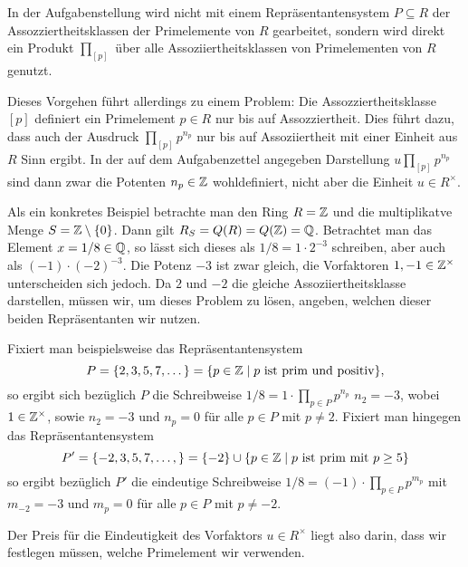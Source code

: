 \documentclass[a4paper,10pt,numbers=noenddot]{scrartcl}
\begin{document}
\begin{remark}
  In der Aufgabenstellung wird nicht mit einem Repräsentantensystem $P \subseteq R$ der Assozziertheitsklassen der Primelemente von $R$ gearbeitet, sondern wird direkt ein Produkt $\prod_{[p]}$ über alle Assoziiertheitsklassen von Primelementen von $R$ genutzt.
  
  Dieses Vorgehen führt allerdings zu einem Problem:
  Die Assozziertheitsklasse $[p]$ definiert ein Primelement $p \in R$ nur bis auf Assozziertheit.
  Dies führt dazu, dass auch der Ausdruck $\prod_{[p]} p^{n_p}$ nur bis auf Assoziiertheit mit einer Einheit aus $R$ Sinn ergibt.
  In der auf dem Aufgabenzettel angegeben Darstellung $u \prod_{[p]} p^{n_p}$ sind dann zwar die Potenten $n_p \in \mathbb{Z}$ wohldefiniert, nicht aber die Einheit $u \in R^\times$.
  
  Als ein konkretes Beispiel betrachte man den Ring $R = \mathbb{Z}$ und die multiplikatve Menge $S = \mathbb{Z} \setminus \{0\}$.
  Dann gilt $R_S = Q(R) = Q(\mathbb{Z}) = \mathbb{Q}$.
  Betrachtet man das Element $x = 1/8 \in \mathbb{Q}$, so lässt sich dieses als $1/8 = 1 \cdot 2^{-3}$ schreiben, aber auch als $(-1) \cdot (-2)^{-3}$.
  Die Potenz $-3$ ist zwar gleich, die Vorfaktoren $1, -1 \in \mathbb{Z}^\times$ unterscheiden sich jedoch.
  Da $2$ und $-2$ die gleiche Assoziiertheitsklasse darstellen, müssen wir, um dieses Problem zu lösen, angeben, welchen dieser beiden Repräsentanten wir nutzen.
  
  Fixiert man beispielsweise das Repräsentantensystem
  \[
      P
    = \{ 2, 3, 5, 7, \dotsc \}
    = \{p \in \mathbb{Z} \mid \text{$p$ ist prim und positiv}\},
  \]
  so ergibt sich bezüglich $P$ die Schreibweise $1/8 = 1 \cdot \prod_{p \in P} p^{n_p}$ $n_2 = -3$, wobei $1 \in \mathbb{Z}^\times$, sowie $n_2 = -3$ und $n_p = 0$ für alle $p \in P$ mit $p \neq 2$.
  Fixiert man hingegen das Repräsentantensystem
  \[
      P'
    = \{ -2, 3, 5, 7, \dotsc, \}
    = \{ -2 \} \cup \{p \in \mathbb{Z} \mid \text{$p$ ist prim mit $p \geq 5$}\}
  \]
  so ergibt bezüglich $P'$ die eindeutige Schreibweise $1/8 = (-1) \cdot \prod_{p \in P} p^{m_p}$ mit $m_{-2} = -3$ und $m_p = 0$ für alle $p \in P$ mit $p \neq -2$.
  
  Der Preis für die Eindeutigkeit des Vorfaktors $u \in R^\times$ liegt also darin, dass wir festlegen müssen, welche Primelement wir verwenden.
\end{remark}
\end{document}
